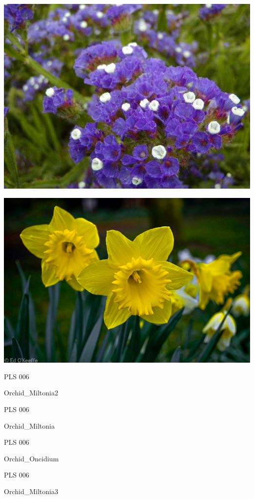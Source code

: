 \documentclass{article}
\begin{document}
\begin{center}
\includegraphics[height=0.925\paperheight]{../Limonium_sinuatum.jpg}
\end{center}
\newpage

\begin{center}
\includegraphics[height=0.925\paperheight]{../Narcissus_(Daffodil).jpg}
\end{center}
\newpage

\noindent  PLS 006
\vfill
\centerline{{\huge Orchid\_Miltonia2 }}
\vfill
\newpage

\noindent  PLS 006
\vfill
\centerline{{\huge Orchid\_Miltonia }}
\vfill
\newpage

\noindent  PLS 006
\vfill
\centerline{{\huge Orchid\_Oncidium }}
\vfill
\newpage

\noindent  PLS 006
\vfill
\centerline{{\huge Orchid\_Miltonia3 }}
\vfill
\newpage
\end{document}
